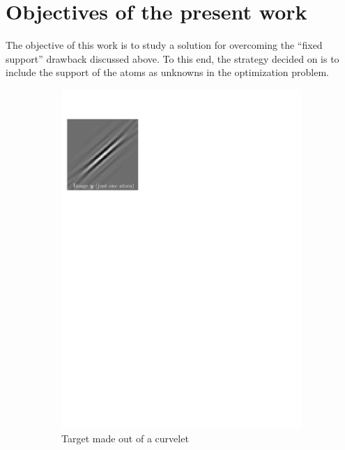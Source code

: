 \FloatBarrier
\section{Objectives of the present work}

The objective of this work is to study a solution for overcoming the “fixed support” drawback discussed above. To this end, the strategy decided on is to include the support of the atoms as unknowns in the optimization problem.

\begin{figure}[!ht]\centering
\begin{subfigure}[b]{0.32\textwidth}\centering
	\includegraphics[width=\textwidth]{figures/manual-better-support/target.pdf}
	\caption{Target made out of a curvelet}\label{fig_fixed_vs_expected-target}
\end{subfigure}
\begin{subfigure}[b]{0.32\textwidth}\centering

\end{subfigure}
\end{figure}
